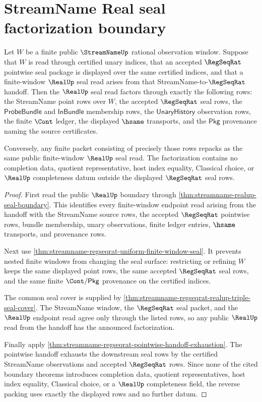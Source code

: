 \section{StreamName Real seal factorization boundary}
\label{sec:streamname-real-seal-factorization-boundary}

\begin{theorem}
\label{thm:streamname-real-seal-factorization-boundary}
Let $W$ be a finite public $\StreamNameUp$ rational observation window. Suppose
that $W$ is read through certified unary indices, that an accepted
$\RegSeqRat$ pointwise seal package is displayed over the same certified
indices, and that a finite-window $\RealUp$ seal read arises from that
StreamName-to-$\RegSeqRat$ handoff. Then the $\RealUp$ seal read factors
through exactly the following rows: the StreamName point rows over $W$, the
accepted $\RegSeqRat$ seal rows, the $\mathsf{ProbeBundle}$ and
$\mathsf{InBundle}$ membership rows, the $\mathsf{UnaryHistory}$ observation
rows, the finite $\Cont$ ledger, the displayed $\hsame$ transports, and the
$\mathsf{Pkg}$ provenance naming the source certificates.

Conversely, any finite packet consisting of precisely those rows repacks as
the same public finite-window $\RealUp$ seal read. The factorization contains
no completion data, quotient representative, host index equality, Classical
choice, or $\RealUp$ completeness datum outside the displayed
$\RegSeqRat$ seal rows.
\end{theorem}
\begin{proof}
First read the public $\RealUp$ boundary through
\autoref{thm:streamname-realup-seal-boundary}. This identifies every
finite-window endpoint read arising from the handoff with the StreamName source
rows, the accepted $\RegSeqRat$ pointwise rows, bundle membership, unary
observations, finite ledger entries, $\hsame$ transports, and provenance rows.

Next use \autoref{thm:streamname-regseqrat-uniform-finite-window-seal}. It
prevents nested finite windows from changing the seal surface: restricting or
refining $W$ keeps the same displayed point rows, the same accepted
$\RegSeqRat$ seal rows, and the same finite $\Cont/\mathsf{Pkg}$ provenance
on the certified indices.

The common seal cover is supplied by
\autoref{thm:streamname-regseqrat-realup-triple-seal-cover}. The StreamName
window, the $\RegSeqRat$ seal packet, and the $\RealUp$ endpoint read agree
only through the listed rows, so any public $\RealUp$ read from the handoff
has the announced factorization.

Finally apply
\autoref{thm:streamname-regseqrat-pointwise-handoff-exhaustion}. The pointwise
handoff exhausts the downstream seal rows by the certified StreamName
observations and accepted $\RegSeqRat$ rows. Since none of the cited boundary
theorems introduces completion data, quotient representatives, host index
equality, Classical choice, or a $\RealUp$ completeness field, the reverse
packing uses exactly the displayed rows and no further datum.
\end{proof}

